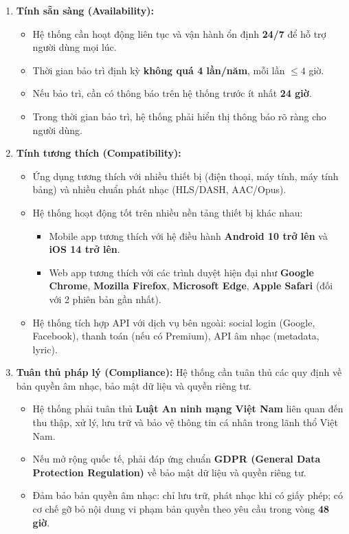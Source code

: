 \begin{enumerate}
    \item \textbf{Tính sẵn sàng (Availability):}
    \begin{itemize}
        \item Hệ thống cần hoạt động liên tục và vận hành ổn định \textbf{24/7} để hỗ trợ người dùng mọi lúc.
        \item Thời gian bảo trì định kỳ \textbf{không quá 4 lần/năm}, mỗi lần $\leq 4$ giờ.
        \item Nếu bảo trì, cần có thông báo trên hệ thống trước ít nhất \textbf{24 giờ}.
        \item Trong thời gian bảo trì, hệ thống phải hiển thị thông báo rõ ràng cho người dùng.
    \end{itemize}

    \item \textbf{Tính tương thích (Compatibility):}
    \begin{itemize}
        \item Ứng dụng tương thích với nhiều thiết bị (điện thoại, máy tính, máy tính bảng) và nhiều chuẩn phát nhạc (HLS/DASH, AAC/Opus).
        \item Hệ thống hoạt động tốt trên nhiều nền tảng thiết bị khác nhau:
        \begin{itemize}
            \item Mobile app tương thích với hệ điều hành \textbf{Android 10 trở lên} và \textbf{iOS 14 trở lên}.
            \item Web app tương thích với các trình duyệt hiện đại như \textbf{Google Chrome}, \textbf{Mozilla Firefox}, \textbf{Microsoft Edge}, \textbf{Apple Safari} (đối với 2 phiên bản gần nhất).
        \end{itemize}
        \item Hệ thống tích hợp API với dịch vụ bên ngoài: social login (Google, Facebook), thanh toán (nếu có Premium), API âm nhạc (metadata, lyric).
    \end{itemize}

    \item \textbf{Tuân thủ pháp lý (Compliance):} Hệ thống cần tuân thủ các quy định về bản quyền âm nhạc, bảo mật dữ liệu và quyền riêng tư.
    \begin{itemize}
        \item Hệ thống phải tuân thủ \textbf{Luật An ninh mạng Việt Nam} liên quan đến thu thập, xử lý, lưu trữ và bảo vệ thông tin cá nhân trong lãnh thổ Việt Nam.
        \item Nếu mở rộng quốc tế, phải đáp ứng chuẩn \textbf{GDPR (General Data Protection Regulation)} về bảo mật dữ liệu và quyền riêng tư.
        \item Đảm bảo bản quyền âm nhạc: chỉ lưu trữ, phát nhạc khi có giấy phép; có cơ chế gỡ bỏ nội dung vi phạm bản quyền theo yêu cầu trong vòng \textbf{48 giờ}.
    \end{itemize}


\end{enumerate}
